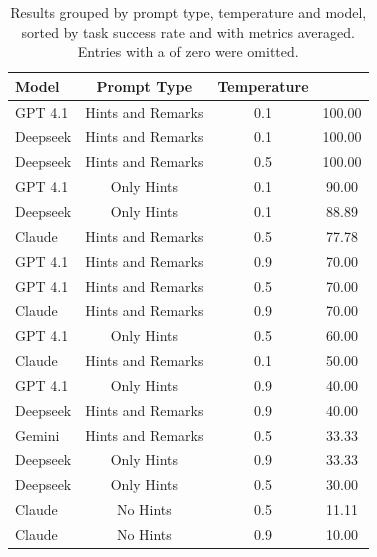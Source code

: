 \documentclass[12pt,a4paper,openright,twoside]{book}
\begin{document}
\begin{table}[htbp]
    \centering
    \footnotesize
    \begin{tabular}{l|cc|c}%
        \toprule
        \textbf{Model} & \textbf{Prompt Type} & \textbf{Temperature} & \TSR{} \\  
        \midrule
        GPT 4.1 & Hints and Remarks & 0.1 & 100.00 \\
        Deepseek & Hints and Remarks & 0.1 & 100.00 \\
        Deepseek & Hints and Remarks & 0.5 & 100.00 \\
        GPT 4.1 & Only Hints & 0.1 & 90.00 \\
        Deepseek & Only Hints & 0.1 & 88.89 \\
        Claude & Hints and Remarks & 0.5 & 77.78 \\
        GPT 4.1 & Hints and Remarks & 0.9 & 70.00 \\
        GPT 4.1 & Hints and Remarks & 0.5 & 70.00 \\
        Claude & Hints and Remarks & 0.9 & 70.00 \\
        GPT 4.1 & Only Hints & 0.5 & 60.00 \\
        Claude & Hints and Remarks & 0.1 & 50.00 \\
        GPT 4.1 & Only Hints & 0.9 & 40.00 \\
        Deepseek & Hints and Remarks & 0.9 & 40.00 \\
        Gemini & Hints and Remarks & 0.5 & 33.33 \\
        Deepseek & Only Hints & 0.9 & 33.33 \\
        Deepseek & Only Hints & 0.5 & 30.00 \\
        Claude & No Hints & 0.5 & 11.11 \\
        Claude & No Hints & 0.9 & 10.00 \\
        \bottomrule
    \end{tabular}
    \caption{Results grouped by prompt type, temperature and model, sorted by task success rate and with metrics averaged. Entries with a \TSR{} of zero were omitted.}
    \label{tab:byTempPromptAndModel}
\end{table}
\end{document}
